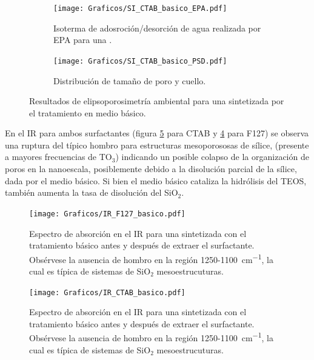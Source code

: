 {		\begin{figure}[!ht]
		  	\begin{subfigure}[t]{0.495\textwidth}
		  	\texttt{[image: Graficos/SI\_CTAB\_basico\_EPA.pdf]}
			\caption[Elipsoporsimetría \pdmC\space tratamiento básico.]{Isoterma de adosroción/desorción de agua realizada por EPA para una \pdmC.}
			\label{fig:CTAB_basico_EPA}
			\end{subfigure}
			\begin{subfigure}[t]{0.495\textwidth}
		  	\texttt{[image: Graficos/SI\_CTAB\_basico\_PSD.pdf]}
			\caption{Distribución de tamaño de poro y cuello.\\ }
			\label{fig:CTAB_basico_PSD}
			\end{subfigure}
			\caption[Elipsoporosimetría \pdmC\space tratamiento básico.]{Resultados de elipsoporosimetría ambiental para una \pdmC\space sintetizada por el tratamiento en medio básico.}
			\end{figure}

		En el IR para ambos surfactantes (figura \ref{fig:IR_CTAB_basico} para CTAB y \ref{fig:IR_F127_basico} para F127) se observa una ruptura del típico hombro para estructuras mesoporososas de sílice\cite{Olsen1989,Innocenzi2003,Angelome2008}, (presente a mayores frecuencias de TO$_3$) indicando un posible colapso de la organización de poros en la nanoescala, posiblemente debido a la disolución parcial de la sílice, dada por el medio básico. Si bien el medio básico cataliza la hidrólisis del TEOS, también aumenta la tasa de disolución del SiO$_2$.\cite{Mazer1994,Niibori2000,Gorrepati2010}

		\begin{figure}[!ht]
			\begin{center}
			\texttt{[image: Graficos/IR\_F127\_basico.pdf]}
			\caption[FTIR \pdmF\space tratamiento básico.]{Espectro de absorción en el IR para una \pdmF\space sintetizada con el tratamiento básico antes y después de extraer el surfactante. Obsérvese la ausencia de hombro en la región 1250-\SI{1100}{\cm^{-1}}, la cual es típica de sistemas de SiO$_2$ mesoestrucuturas.}
			\label{fig:IR_F127_basico}
			\end{center}
			\end{figure}

        \clearpage

		\begin{figure}[!ht]
			\begin{center}
			\texttt{[image: Graficos/IR\_CTAB\_basico.pdf]}
			\caption[FTIR \pdmC\space tratamiento básico.]{Espectro de absorción en el IR para una \pdmC\space sintetizada con el tratamiento básico antes y después de extraer el surfactante. Obsérvese la ausencia de hombro en la región 1250-\SI{1100}{\cm^{-1}}, la cual es típica de sistemas de SiO$_2$ mesoestrucuturas.}
			\label{fig:IR_CTAB_basico}
			\end{center}
			\end{figure}		

}
